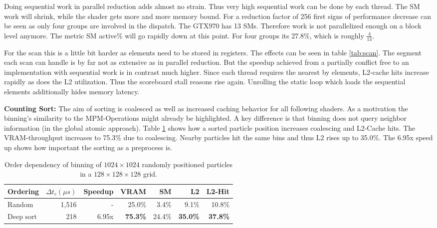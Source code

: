 \documentclass[m,times]{cgMA}
\begin{document}
Doing sequential work in parallel reduction adds almost no strain. Thus very high sequential work can be done by each thread. The SM work will shrink, while the shader gets more and more memory bound. For a reduction factor of 256 first signs of performance decrease can be seen as only four groups are involved in the dispatch. The GTX970 has 13 SMs. Therefore work is not parallelized enough on a block level anymore. The metric SM active\% will go rapidly down at this point. For four groups its 27.8\%, which is roughly $\frac{4}{13}$.

For the scan this is a little bit harder as elements need to be stored in registers. The effects can be seen in table \ref{tab:scan}. The segment each scan can handle is by far not as extensive as in parallel reduction. But the speedup achieved from a partially conflict free to an implementation with sequential work is in contrast much higher. Since each thread requires the nearest by elements, L2-cache hits increase rapidly as does the L2 utilization. Thus the scoreboard stall reasons rise again. Unrolling the static loop which loads the sequential elements additionally hides memory latency.

\textbf{Counting Sort:} The aim of sorting is coalesced as well as increased caching behavior for all following shaders. As a motivation the binning's similarity to the MPM-Operations might already be highlighted. A key difference is that binning does not query neighbor information (in the global atomic approach). Table \ref{table:bin} shows how a sorted particle position increases coalescing and L2-Cache hits. The VRAM-throughput increases to 75.3\% due to coalescing. Nearby particles hit the same bins and thus L2 rises up to 35.0\%. The 6.95x speed up shows how important the sorting as a preprocess is.
\begin{table}[htbp]
  \begin{tabular}{ | l | r | r | r | r | r | r |}    \hline
    Ordering            &  $\Delta t_c (\mu s)$ & Speedup &VRAM              & SM      & L2     & L2-Hit \\\hline
    Random              &  1,516                & -       &25.0\%            & 3.4\%   & 9.1\%  & 10.8\% \\\hline
    Deep sort           &    218                & 6.95x   &\textbf{75.3\%}   & 24.4\%  & \textbf{35.0\%} & \textbf{37.8\%} \\
    \hline
 \end{tabular}
\caption{Order dependency of binning of $1024\times1024$ randomly positioned particles in a $128\times128\times128$ grid.}\label{table:bin}
\end{table}
\end{document}
